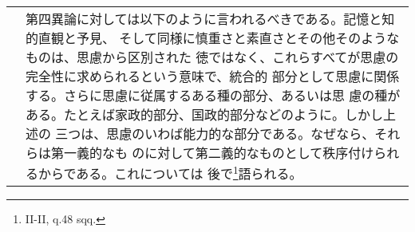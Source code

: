 \documentclass[10pt]{jsarticle}
\begin{document}
\begin{longtable}{p{21em}p{21em}}
&

第四異論に対しては以下のように言われるべきである。記憶と知的直観と予見、
そして同様に慎重さと素直さとその他そのようなものは、思慮から区別された
徳ではなく、これらすべてが思慮の完全性に求められるという意味で、統合的
部分として思慮に関係する。さらに思慮に従属するある種の部分、あるいは思
慮の種がある。たとえば家政的部分、国政的部分などのように。しかし上述の
三つは、思慮のいわば能力的な部分である。なぜなら、それらは第一義的なも
のに対して第二義的なものとして秩序付けられるからである。これについては
後で\footnote{II-II, q.48 sqq.}語られる。

\end{longtable}
\end{document}
